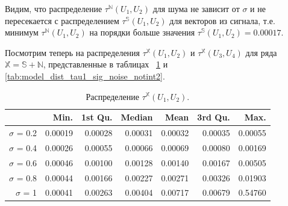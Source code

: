 \documentclass[specialist,
               substylefile = spbu.rtx,
               subf,href,colorlinks=true, 12pt]{disser}
\begin{document}
Видим, что распределение $\tau^{\mathbb{N}}(U_1, U_2)$ для шума не зависит от $\sigma$ и не пересекается с распределением $\tau^{\mathbb{S}}(U_1, U_2)$ для векторов из сигнала, т.е. минимум $\tau^{\mathbb{N}}(U_1, U_2)$ на порядки больше значения $\tau^{\mathbb{S}}(U_1, U_2) = 0.00017$.
%
%


Посмотрим теперь на распределения  $\tau^{\mathbb{X}}(U_1, U_2)$ и  $\tau^{\mathbb{X}}(U_3, U_4)$ для ряда $\mathbb{X} = \mathbb{S} + \mathbb{N}$, представленные в таблицах ~\ref{tab:model_dist_tau1_sig_noise_notint} и \ref{tab:model_dist_tau1_sig_noise_notint2}.

\begin{table}[hhh!]
\caption{Распределение $\tau^{\mathbb{X}}(U_1, U_2)$.}
\centering
\begin{tabular}{rrrrrrr}
  \hline
 & Min. & 1st Qu. & Median & Mean & 3rd Qu. & Max. \\
  \hline
$\sigma$ = 0.2 & 0.00019 & 0.00028 & 0.00031 & 0.00032 & 0.00035 & 0.00055 \\ 
  $\sigma$ = 0.4 & 0.00026 & 0.00055 & 0.00066 & 0.00069 & 0.00080 & 0.00169 \\ 
  $\sigma$ = 0.6 & 0.00046 & 0.00100 & 0.00128 & 0.00140 & 0.00167 & 0.00505 \\ 
  $\sigma$ = 0.8 & 0.00044 & 0.00166 & 0.00227 & 0.00271 & 0.00326 & 0.01903 \\ 
  $\sigma$ = 1 & 0.00041 & 0.00263 & 0.00404 & 0.00717 & 0.00679 & 0.54760 \\ 
   \hline
\end{tabular}
\label{tab:model_dist_tau1_sig_noise_notint}
\end{table}
\end{document}
